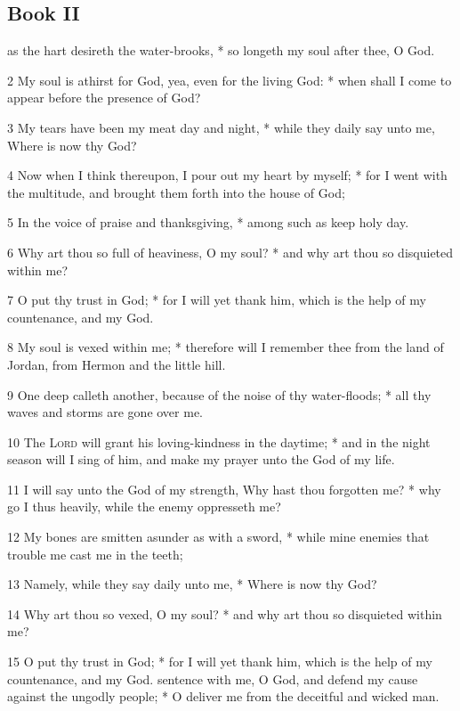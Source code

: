 \subsection{Book II}
 as the hart desireth the water-brooks, * so longeth my soul after thee, O God.\par
2 My soul is athirst for God, yea, even for the living God: * when shall I come to appear before the presence of God?\par
3 My tears have been my meat day and night, * while they daily say unto me, Where is now thy God?\par
4 Now when I think thereupon, I pour out my heart by myself; * for I went with the multitude, and brought them forth into the house of God;\par
5 In the voice of praise and thanksgiving, * among such as keep holy day.\par
6 Why art thou so full of heaviness, O my soul? * and why art thou so disquieted within me?\par
7 O put thy trust in God; * for I will yet thank him, which is the help of my countenance, and my God.\par
8 My soul is vexed within me; * therefore will I remember thee from the land of Jordan, from Hermon and the little hill.\par
9 One deep calleth another, because of the noise of thy water-floods; * all thy waves and storms are gone over me.\par
10 The {\textsc{Lord}} will grant his loving-kindness in the daytime; * and in the night season will I sing of him, and make my prayer unto the God of my life.\par
11 I will say unto the God of my strength, Why hast thou forgotten me? * why go I thus heavily, while the enemy oppresseth me?\par
12 My bones are smitten asunder as with a sword, * while mine enemies that trouble me cast me in the teeth;\par
13 Namely, while they say daily unto me, * Where is now thy God?\par
14 Why art thou so vexed, O my soul? * and why art thou so disquieted within me?\par
15 O put thy trust in God; * for I will yet thank him, which is the help of my countenance, and my God.
 sentence with me, O God, and defend my cause against the ungodly people; * O deliver me from the deceitful and wicked man.\par
